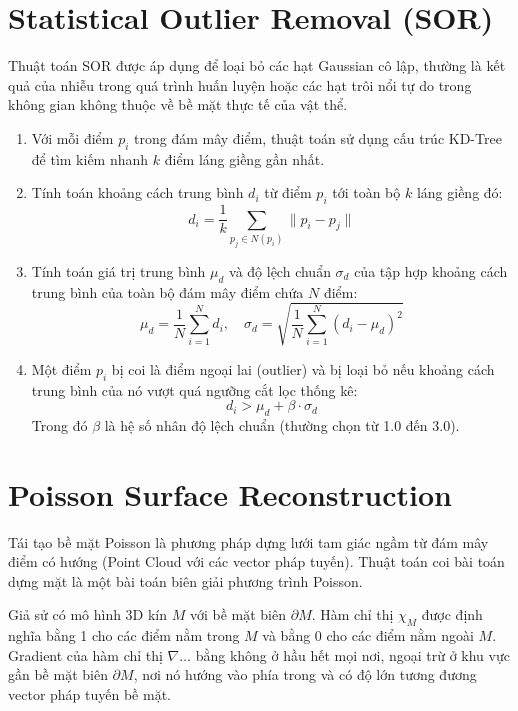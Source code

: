 \documentclass[a4paper,12pt]{report}
\begin{document}
\section{Statistical Outlier Removal (SOR)}
Thuật toán SOR được áp dụng để loại bỏ các hạt Gaussian cô lập, thường là kết quả của nhiễu trong quá trình huấn luyện hoặc các hạt trôi nổi tự do trong không gian không thuộc về bề mặt thực tế của vật thể.
\begin{enumerate}
    \item Với mỗi điểm $p_i$ trong đám mây điểm, thuật toán sử dụng cấu trúc KD-Tree để tìm kiếm nhanh $k$ điểm láng giềng gần nhất.
    \item Tính toán khoảng cách trung bình $d_i$ từ điểm $p_i$ tới toàn bộ $k$ láng giềng đó:
    \begin{equation}
        d_i = \frac{1}{k} \sum_{p_j \in N(p_i)} \|p_i - p_j\|
    \end{equation}
    \item Tính toán giá trị trung bình $\mu_d$ và độ lệch chuẩn $\sigma_d$ của tập hợp khoảng cách trung bình của toàn bộ đám mây điểm chứa $N$ điểm:
    \begin{equation}
        \mu_d = \frac{1}{N} \sum_{i=1}^N d_i, \quad \sigma_d = \sqrt{\frac{1}{N} \sum_{i=1}^N (d_i - \mu_d)^2}
    \end{equation}
    \item Một điểm $p_i$ bị coi là điểm ngoại lai (outlier) và bị loại bỏ nếu khoảng cách trung bình của nó vượt quá ngưỡng cắt lọc thống kê:
    \begin{equation}
        d_i > \mu_d + \beta \cdot \sigma_d
    \end{equation}
    Trong đó $\beta$ là hệ số nhân độ lệch chuẩn (thường chọn từ 1.0 đến 3.0).
\end{enumerate}

\section{Poisson Surface Reconstruction}
Tái tạo bề mặt Poisson là phương pháp dựng lưới tam giác ngầm từ đám mây điểm có hướng (Point Cloud với các vector pháp tuyến). Thuật toán coi bài toán dựng mặt là một bài toán biên giải phương trình Poisson.

Giả sử có mô hình 3D kín $M$ với bề mặt biên $\partial M$. Hàm chỉ thị $\chi_M$ được định nghĩa bằng 1 cho các điểm nằm trong $M$ và bằng 0 cho các điểm nằm ngoài $M$. Gradient của hàm chỉ thị $\nabla \dots$ bằng không ở hầu hết mọi nơi, ngoại trừ ở khu vực gần bề mặt biên $\partial M$, nơi nó hướng vào phía trong và có độ lớn tương đương vector pháp tuyến bề mặt.
\end{document}
